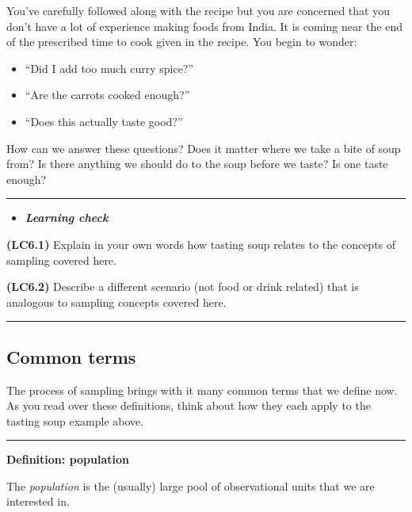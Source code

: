 \documentclass[]{tufte-book}
\let\oldrule=\rule
\renewcommand{\rule}[1]{\oldrule{\linewidth}}
\providecommand{\tightlist}{%
  \setlength{\itemsep}{0pt}\setlength{\parskip}{0pt}}
\newenvironment{rmdblock}[1]
  {\begin{shaded*}
  \begin{itemize}
  \renewcommand{\labelitemi}{
    \raisebox{-.7\height}[0pt][0pt]{
    }
  }
  \item
  }
  {
  \end{itemize}
  \end{shaded*}
  }
\newenvironment{learncheck}
  {\begin{rmdblock}{warning}}
  {\end{rmdblock}}
\begin{document}
You've carefully followed along with the recipe but you are concerned
that you don't have a lot of experience making foods from India. It is
coming near the end of the prescribed time to cook given in the recipe.
You begin to wonder:

\begin{itemize}
\tightlist
\item
  ``Did I add too much curry spice?''
\item
  ``Are the carrots cooked enough?''\\
\item
  ``Does this actually taste good?''
\end{itemize}

How can we answer these questions? Does it matter where we take a bite
of soup from? Is there anything we should do to the soup before we
taste? Is one taste enough?

\begin{center}\rule{0.5\linewidth}{\linethickness}\end{center}

\begin{learncheck}
\textbf{\emph{Learning check}}
\end{learncheck}

\textbf{(LC6.1)} Explain in your own words how tasting soup relates to
the concepts of sampling covered here.

\textbf{(LC6.2)} Describe a different scenario (not food or drink
related) that is analogous to sampling concepts covered here.

\begin{center}\rule{0.5\linewidth}{\linethickness}\end{center}

\subsection{Common terms}\label{common-terms}

The process of sampling brings with it many common terms that we define
now. As you read over these definitions, think about how they each apply
to the tasting soup example above.

\begin{center}\rule{0.5\linewidth}{\linethickness}\end{center}

\textbf{Definition: population}

The \emph{population} is the (usually) large pool of observational units
that we are interested in.
\end{document}

